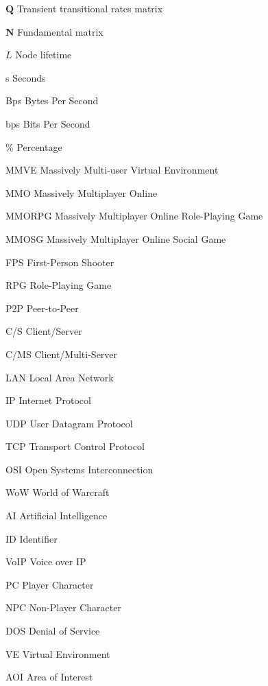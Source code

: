 \begin{Nomencl}[\gnat]
        \item[$\textbf{Q}$]             Transient transitional rates matrix
        \item[$\textbf{N}$]             Fundamental matrix
        \item[$L$]                      Node lifetime
        \item[s]        Seconds
        \item[Bps]      Bytes Per Second
        \item[bps]      Bits Per Second
        \item[\%]       Percentage
		\item[MMVE]		Massively Multi-user Virtual Environment
        \item[MMO]		Massively Multiplayer Online
        \item[MMORPG]   Massively Multiplayer Online Role-Playing Game
        \item[MMOSG]    Massively Multiplayer Online Social Game
        \item[FPS]      First-Person Shooter
        \item[RPG]      Role-Playing Game
        \item[P2P]      Peer-to-Peer
        \item[C/S]      Client/Server
        \item[C/MS]     Client/Multi-Server
        \item[LAN]      Local Area Network
        \item[IP]       Internet Protocol
        \item[UDP]      User Datagram Protocol
        \item[TCP]      Transport Control Protocol
        \item[OSI]      Open Systems Interconnection
        \item[WoW]      World of Warcraft
        \item[AI]       Artificial Intelligence
        \item[ID]       Identifier
        \item[VoIP]     Voice over IP
        \item[PC]       Player Character
        \item[NPC]      Non-Player Character
        \item[DOS]      Denial of Service
        \item[VE]       Virtual Environment
        \item[AOI]      Area of Interest

\end{Nomencl}
